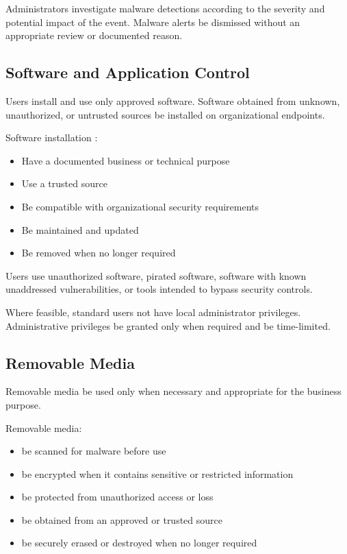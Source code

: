 Administrators \must{} investigate malware detections according to the severity and potential impact of the event. Malware alerts \mustnot{} be dismissed without an appropriate review or documented reason.

\subsection{Software and Application Control}

Users \must{} install and use only approved software. Software obtained from unknown, unauthorized, or untrusted sources \mustnot{} be installed on organizational endpoints.

Software installation \must{}:
\begin{itemize}
    \item Have a documented business or technical purpose
    \item Use a trusted source
    \item Be compatible with organizational security requirements
    \item Be maintained and updated
    \item Be removed when no longer required
\end{itemize}

Users \mustnot{} use unauthorized software, pirated software, software with known unaddressed vulnerabilities, or tools intended to bypass security controls.

Where feasible, standard users \should{} not have local administrator privileges. Administrative privileges \must{} be granted only when required and \should{} be time-limited.

\subsection{Removable Media}

Removable media \must{} be used only when necessary and appropriate for the business purpose.

Removable media:
\begin{itemize}
    \item \must{} be scanned for malware before use
    \item \must{} be encrypted when it contains sensitive or restricted information
    \item \must{} be protected from unauthorized access or loss
    \item \must{} be obtained from an approved or trusted source
    \item \must{} be securely erased or destroyed when no longer required
\end{itemize}

